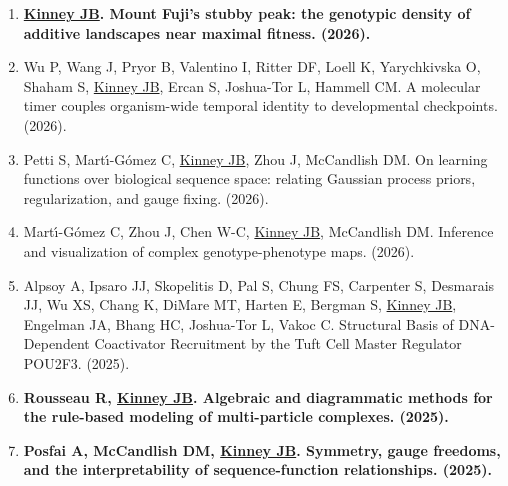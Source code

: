 \documentclass[10pt,hidelinks]{article}
\begin{document}
\begin{enumerate}

\item \textbf{\underline{Kinney JB}. Mount Fuji's stubby peak: the genotypic density of additive landscapes near maximal fitness.  (2026).}

\item Wu P, Wang J, Pryor B, Valentino I, Ritter DF, Loell K, Yarychkivska O, Shaham S, \underline{Kinney JB}, Ercan S, Joshua-Tor L, Hammell CM. A molecular timer couples organism-wide temporal identity to developmental checkpoints.  (2026).

\item Petti S, Mart{\'\i}-G{\'o}mez C, \underline{Kinney JB}, Zhou J, McCandlish DM. On learning functions over biological sequence space: relating Gaussian process priors, regularization, and gauge fixing.  (2026).

\item Mart{\'\i}-G{\'o}mez C, Zhou J, Chen W-C, \underline{Kinney JB}, McCandlish DM. Inference and visualization of complex genotype-phenotype maps.  (2026).

\item Alpsoy A, Ipsaro JJ, Skopelitis D, Pal S, Chung FS, Carpenter S, Desmarais JJ, Wu XS, Chang K, DiMare MT, Harten E, Bergman S, \underline{Kinney JB}, Engelman JA, Bhang HC, Joshua-Tor L, Vakoc C. Structural Basis of DNA-Dependent Coactivator Recruitment by the Tuft Cell Master Regulator POU2F3.  (2025).

\item \textbf{Rousseau R, \underline{Kinney JB}. Algebraic and diagrammatic methods for the rule-based modeling of multi-particle complexes.  (2025).}

\item \textbf{Posfai A, McCandlish DM, \underline{Kinney JB}. Symmetry, gauge freedoms, and the interpretability of sequence-function relationships.  (2025).}


\end{enumerate}
\end{document}
